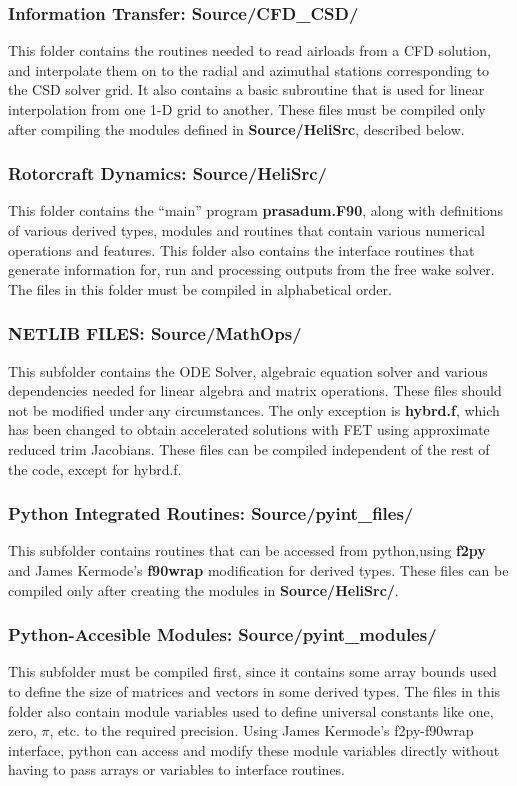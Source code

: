 \subsubsection{Information Transfer: Source/CFD\_CSD/}
This folder contains the routines needed to read airloads from a CFD solution, and interpolate them on to the radial and azimuthal stations corresponding to the CSD solver grid. It also contains a basic subroutine that is used for linear interpolation from one 1-D grid to another. These files must be compiled only after compiling the modules defined in \textbf{Source/HeliSrc}, described below.

\subsubsection{Rotorcraft Dynamics: Source/HeliSrc/}
This folder contains the ``main'' program \textbf{prasadum.F90}, along with definitions of various derived types, modules and routines that contain various numerical operations and features. This folder also contains the interface routines that generate information for, run and processing outputs from the free wake solver. The files in this folder must be compiled in alphabetical order.

\subsubsection{NETLIB FILES: Source/MathOps/}
 This subfolder contains the ODE Solver, algebraic equation solver and various dependencies needed for linear algebra and matrix operations. These files should not be modified under any circumstances. The only exception is \textbf{hybrd.f}, which has been changed to obtain accelerated solutions with FET using approximate reduced trim Jacobians. These files can be compiled independent of the rest of the code, except for hybrd.f.
 
\subsubsection{Python Integrated Routines: Source/pyint\_files/}
This subfolder contains routines that can be accessed from python,using \textbf{f2py} and James Kermode's \textbf{f90wrap} modification for derived types. These files can be compiled only after creating the modules in \textbf{Source/HeliSrc/}. 

\subsubsection{Python-Accesible Modules: Source/pyint\_modules/}
This subfolder must be compiled first, since it contains some array bounds used to define the size of matrices and vectors in some derived types. The files in this folder also contain module variables used to define universal constants like one, zero, $\pi$, etc. to the required precision. Using James Kermode's f2py-f90wrap interface, python can access and modify these module variables directly without having to pass arrays or variables to interface routines. 

